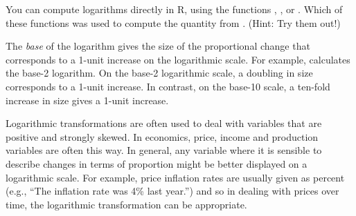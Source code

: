 You can compute logarithms directly in R, using the functions
, , or .  Which of these functions
was used to compute the quantity  from . (Hint: Try
them out!)


The {\em base} of the logarithm gives the size of the proportional
change that corresponds to a 1-unit increase on the logarithmic
scale.  For example,  calculates the base-2 logarithm.  On
the base-2 logarithmic scale, a doubling in size corresponds to a
1-unit increase.  In contrast, on the base-10 scale, a ten-fold
increase in size gives a 1-unit increase. 

Logarithmic transformations are often used to deal with variables that
are positive and strongly skewed.  In economics, price, income and production
variables are often this way.  In general, any variable where it is
sensible to describe changes in terms of proportion might be better
displayed on a logarithmic scale.  For example, price inflation rates
are usually given as percent (e.g., ``The inflation rate was 4\% last
year.'') and so in dealing with prices over time, the logarithmic
transformation can be appropriate.
